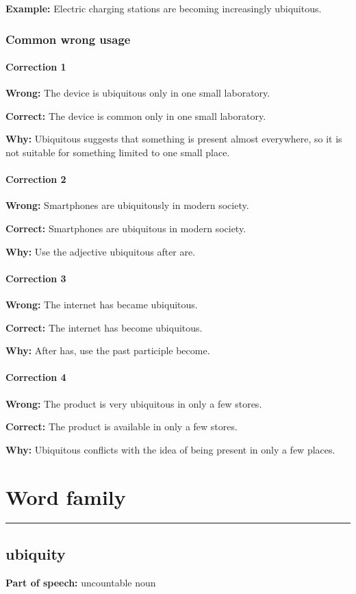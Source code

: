\documentclass[11pt]{article}
\newcommand{\sectionrule}{\par\vspace{-0.5em}\noindent\textcolor{Accent}{\rule{\linewidth}{0.6pt}}\par}
\begin{document}
\textbf{Example:} Electric charging stations are becoming increasingly ubiquitous.

\subsubsection{Common wrong usage}
\paragraph{Correction 1}
\textbf{Wrong:} The device is ubiquitous only in one small laboratory.

\textbf{Correct:} The device is common only in one small laboratory.

\textbf{Why:} Ubiquitous suggests that something is present almost everywhere, so it is not suitable for something limited to one small place.

\paragraph{Correction 2}
\textbf{Wrong:} Smartphones are ubiquitously in modern society.

\textbf{Correct:} Smartphones are ubiquitous in modern society.

\textbf{Why:} Use the adjective ubiquitous after are.

\paragraph{Correction 3}
\textbf{Wrong:} The internet has became ubiquitous.

\textbf{Correct:} The internet has become ubiquitous.

\textbf{Why:} After has, use the past participle become.

\paragraph{Correction 4}
\textbf{Wrong:} The product is very ubiquitous in only a few stores.

\textbf{Correct:} The product is available in only a few stores.

\textbf{Why:} Ubiquitous conflicts with the idea of being present in only a few places.

\section{Word family}
\sectionrule
\subsection{ubiquity}
\textbf{Part of speech:} uncountable noun
\end{document}
